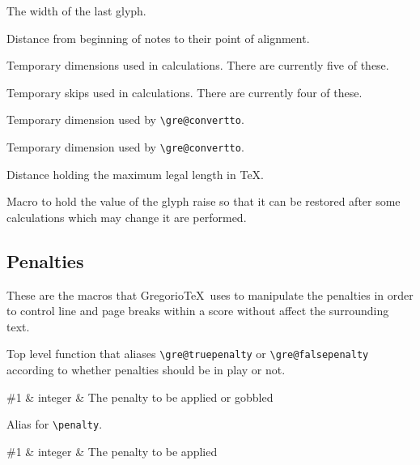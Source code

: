 The width of the last glyph.

Distance from beginning of notes to their point of alignment.

Temporary dimensions used in calculations.  There are currently five of these.

Temporary skips used in calculations.  There are currently four of these.

Temporary dimension used by \verb=\gre@convertto=.

Temporary dimension used by \verb=\gre@convertto=.

Distance holding the maximum legal length in TeX.

Macro to hold the value of the glyph raise so that it can be restored after some calculations which may change it are performed.

\subsection{Penalties}
These are the macros that Gregorio\TeX\ uses to manipulate the penalties in order to control line and page breaks within a score without affect the surrounding text.

Top level function that aliases \verb=\gre@truepenalty= or \verb=\gre@falsepenalty= according to whether penalties should be in play or not.

\begin{argtable}
  \#1 & integer & The penalty to be applied or gobbled\\
\end{argtable}

Alias for \verb=\penalty=.

\begin{argtable}
  \#1 & integer & The penalty to be applied\\
\end{argtable}

